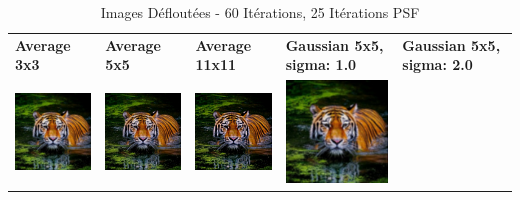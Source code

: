\newpage

\begin{table}[h!]
    \centering
    \captionsetup{justification=centering}
    \caption*{Images Défloutées - 60 Itérations, 25 Itérations PSF}
    \begin{tabular}{>{\centering\arraybackslash}m{3cm} >{\centering\arraybackslash}m{3cm} >{\centering\arraybackslash}m{3cm} >{\centering\arraybackslash}m{3cm} >{\centering\arraybackslash}m{3cm}}
        \textbf{Average 3x3}                                                                                                    & \textbf{Average 5x5} & \textbf{Average 11x11} & \textbf{Gaussian 5x5, sigma: 1.0} & \textbf{Gaussian 5x5, sigma: 2.0} \\
        \includegraphics[width=3cm]{images/blind_processed/tiger/average_3x3/tiger_unblurred_60-iter_25-psf-iter.png}           &
        \includegraphics[width=3cm]{images/blind_processed/tiger/average_5x5/tiger_unblurred_60-iter_25-psf-iter.png}           &
        \includegraphics[width=3cm]{images/blind_processed/tiger/average_11x11/tiger_unblurred_60-iter_25-psf-iter.png}         &
        \includegraphics[width=3cm]{images/blind_processed/tiger/gaussian_5x5_sigma1.0/tiger_unblurred_60-iter_25-psf-iter.png} &

\end{tabular}
\end{table}
